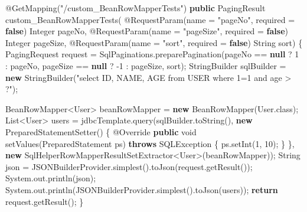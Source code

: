 \documentclass[
]{book}
\newenvironment{Shaded}{\begin{snugshade}}{\end{snugshade}}
\newcommand{\AttributeTok}[1]{\textcolor[rgb]{0.77,0.63,0.00}{#1}}
\newcommand{\BuiltInTok}[1]{#1}
\newcommand{\DataTypeTok}[1]{\textcolor[rgb]{0.13,0.29,0.53}{#1}}
\newcommand{\DecValTok}[1]{\textcolor[rgb]{0.00,0.00,0.81}{#1}}
\newcommand{\FunctionTok}[1]{\textcolor[rgb]{0.00,0.00,0.00}{#1}}
\newcommand{\KeywordTok}[1]{\textcolor[rgb]{0.13,0.29,0.53}{\textbf{#1}}}
\newcommand{\NormalTok}[1]{#1}
\newcommand{\StringTok}[1]{\textcolor[rgb]{0.31,0.60,0.02}{#1}}
\begin{document}
\begin{Shaded}
\begin{Highlighting}[]
{{    \AttributeTok{@GetMapping}\NormalTok{(}\StringTok{"/custom_BeanRowMapperTests"}\NormalTok{)}
    \KeywordTok{public}\NormalTok{ PagingResult }\FunctionTok{custom_BeanRowMapperTests}\NormalTok{(}
            \AttributeTok{@RequestParam}\NormalTok{(name = }\StringTok{"pageNo"}\NormalTok{, required = }\KeywordTok{false}\NormalTok{) }\BuiltInTok{Integer}\NormalTok{ pageNo,}
            \AttributeTok{@RequestParam}\NormalTok{(name = }\StringTok{"pageSize"}\NormalTok{, required = }\KeywordTok{false}\NormalTok{) }\BuiltInTok{Integer}\NormalTok{ pageSize,}
            \AttributeTok{@RequestParam}\NormalTok{(name = }\StringTok{"sort"}\NormalTok{, required = }\KeywordTok{false}\NormalTok{) }\BuiltInTok{String}\NormalTok{ sort) \{}
\NormalTok{        PagingRequest request = SqlPaginations.}\FunctionTok{preparePagination}\NormalTok{(pageNo == }\KeywordTok{null}\NormalTok{ ? }\DecValTok{1}\NormalTok{ : pageNo, pageSize == }\KeywordTok{null}\NormalTok{ ? -}\DecValTok{1}\NormalTok{ : pageSize, sort);}
        \BuiltInTok{StringBuilder}\NormalTok{ sqlBuilder = }\KeywordTok{new} \BuiltInTok{StringBuilder}\NormalTok{(}\StringTok{"select ID, NAME, AGE from USER where 1=1 and age > ?"}\NormalTok{);}

\NormalTok{        BeanRowMapper<User> beanRowMapper = }\KeywordTok{new} \FunctionTok{BeanRowMapper}\NormalTok{(User.}\FunctionTok{class}\NormalTok{);}
        \BuiltInTok{List}\NormalTok{<User> users = jdbcTemplate.}\FunctionTok{query}\NormalTok{(sqlBuilder.}\FunctionTok{toString}\NormalTok{(), }\KeywordTok{new} \FunctionTok{PreparedStatementSetter}\NormalTok{() \{}
            \AttributeTok{@Override}
            \KeywordTok{public} \DataTypeTok{void} \FunctionTok{setValues}\NormalTok{(}\BuiltInTok{PreparedStatement}\NormalTok{ ps) }\KeywordTok{throws} \BuiltInTok{SQLException}\NormalTok{ \{}
\NormalTok{                ps.}\FunctionTok{setInt}\NormalTok{(}\DecValTok{1}\NormalTok{, }\DecValTok{10}\NormalTok{);}
\NormalTok{            \}}
\NormalTok{        \}, }\KeywordTok{new}\NormalTok{ SqlHelperRowMapperResultSetExtractor<User>(beanRowMapper));}
        \BuiltInTok{String}\NormalTok{ json = JSONBuilderProvider.}\FunctionTok{simplest}\NormalTok{().}\FunctionTok{toJson}\NormalTok{(request.}\FunctionTok{getResult}\NormalTok{());}
        \BuiltInTok{System}\NormalTok{.}\FunctionTok{out}\NormalTok{.}\FunctionTok{println}\NormalTok{(json);}
        \BuiltInTok{System}\NormalTok{.}\FunctionTok{out}\NormalTok{.}\FunctionTok{println}\NormalTok{(JSONBuilderProvider.}\FunctionTok{simplest}\NormalTok{().}\FunctionTok{toJson}\NormalTok{(users));}
        \KeywordTok{return}\NormalTok{ request.}\FunctionTok{getResult}\NormalTok{();}
\NormalTok{    \}}

}}
\end{Highlighting}
\end{Shaded}
\end{document}
